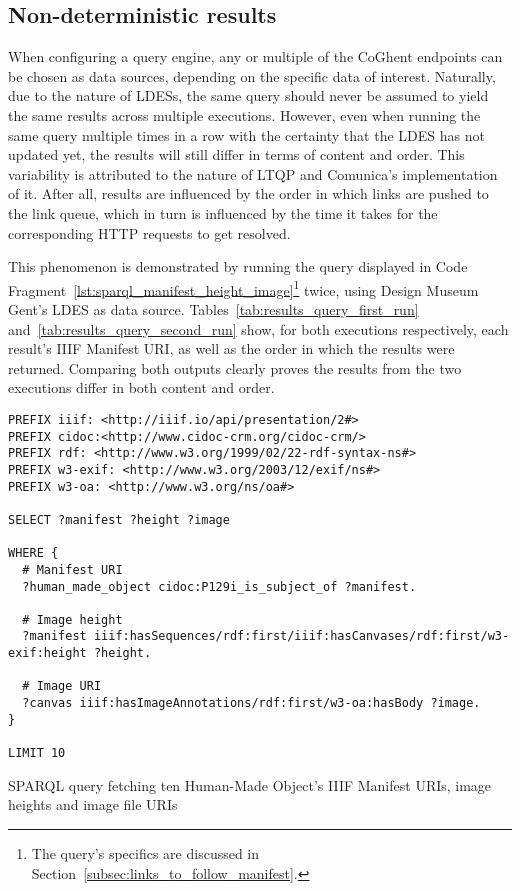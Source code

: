 \subsection{Non-deterministic results}

When configuring a query engine, any or multiple of the CoGhent endpoints can be chosen as data sources, depending on the specific data of interest. Naturally, due to the nature of LDESs, the same query should never be assumed to yield the same results across multiple executions. However, even when running the same query multiple times in a row with the certainty that the LDES has not updated yet, the results will still differ in terms of content and order. This variability is attributed to the nature of LTQP and Comunica's implementation of it. After all, results are influenced by the order in which links are pushed to the link queue, which in turn is influenced by the time it takes for the corresponding HTTP requests to get resolved.

This phenomenon is demonstrated by running the query displayed in Code Fragment~\ref{lst:sparql_manifest_height_image}\footnote{The query's specifics are discussed in Section~\ref{subsec:links_to_follow_manifest}.} twice, using Design Museum Gent's LDES as data source. Tables~\ref{tab:results_query_first_run} and~\ref{tab:results_query_second_run} show, for both executions respectively, each result's IIIF Manifest URI, as well as the order in which the results were returned. Comparing both outputs clearly proves the results from the two executions differ in both content and order.

\begin{listing}[htbp]
    \begin{verbatim}
PREFIX iiif: <http://iiif.io/api/presentation/2#>
PREFIX cidoc:<http://www.cidoc-crm.org/cidoc-crm/>
PREFIX rdf: <http://www.w3.org/1999/02/22-rdf-syntax-ns#>
PREFIX w3-exif: <http://www.w3.org/2003/12/exif/ns#>
PREFIX w3-oa: <http://www.w3.org/ns/oa#>

SELECT ?manifest ?height ?image

WHERE {
  # Manifest URI
  ?human_made_object cidoc:P129i_is_subject_of ?manifest.
  
  # Image height
  ?manifest iiif:hasSequences/rdf:first/iiif:hasCanvases/rdf:first/w3-exif:height ?height.
  
  # Image URI
  ?canvas iiif:hasImageAnnotations/rdf:first/w3-oa:hasBody ?image.
}

LIMIT 10
    \end{verbatim}
    \caption{SPARQL query fetching ten Human-Made Object's IIIF Manifest URIs, image heights and image file URIs}
    \label{lst:sparql_manifest_height_image}
\end{listing}

